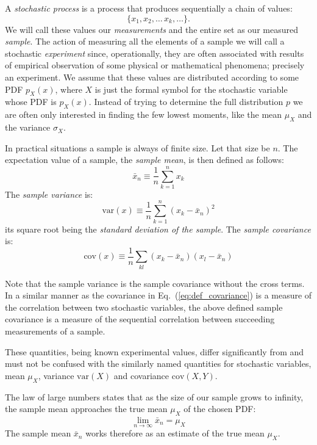 \documentclass[graybox,sectrefs,envcountresetchap,open=right]{svmonodo}
\begin{document}
A \emph{stochastic process} is a process that produces sequentially a
chain of values:
\[
\{x_1, x_2,\dots\,x_k,\dots\}.
\]
We will call these
values our \emph{measurements} and the entire set as our measured
\emph{sample}.  The action of measuring all the elements of a sample
we will call a stochastic \emph{experiment} since, operationally,
they are often associated with results of empirical observation of
some physical or mathematical phenomena; precisely an experiment. We
assume that these values are distributed according to some 
PDF $p_X^{\phantom X}(x)$, where $X$ is just the formal symbol for the
stochastic variable whose PDF is $p_X^{\phantom X}(x)$. Instead of
trying to determine the full distribution $p$ we are often only
interested in finding the few lowest moments, like the mean
$\mu_X^{\phantom X}$ and the variance $\sigma_X^{\phantom X}$.






In practical situations a sample is always of finite size. Let that
size be $n$. The expectation value of a sample, the \emph{sample mean}, is then defined as follows:
\[
\bar{x}_n \equiv \frac{1}{n}\sum_{k=1}^n x_k
\]
The \emph{sample variance} is:
\[
\mathrm{var}(x) \equiv \frac{1}{n}\sum_{k=1}^n (x_k - \bar{x}_n)^2
\]
its square root being the \emph{standard deviation of the sample}. The
\emph{sample covariance} is:
\[
\mathrm{cov}(x)\equiv\frac{1}{n}\sum_{kl}(x_k - \bar{x}_n)(x_l - \bar{x}_n)
\]





Note that the sample variance is the sample covariance without the
cross terms. In a similar manner as the covariance in Eq.~(\ref{eq:def_covariance}) is a measure of the correlation between
two stochastic variables, the above defined sample covariance is a
measure of the sequential correlation between succeeding measurements
of a sample.

These quantities, being known experimental values, differ
significantly from and must not be confused with the similarly named
quantities for stochastic variables, mean $\mu_X$, variance $\mathrm{var}(X)$
and covariance $\mathrm{cov}(X,Y)$.





The law of large numbers
states that as the size of our sample grows to infinity, the sample
mean approaches the true mean $\mu_X^{\phantom X}$ of the chosen PDF:
\[
\lim_{n\to\infty}\bar{x}_n = \mu_X^{\phantom X}
\]
The sample mean $\bar{x}_n$ works therefore as an estimate of the true
mean $\mu_X^{\phantom X}$.
\end{document}

